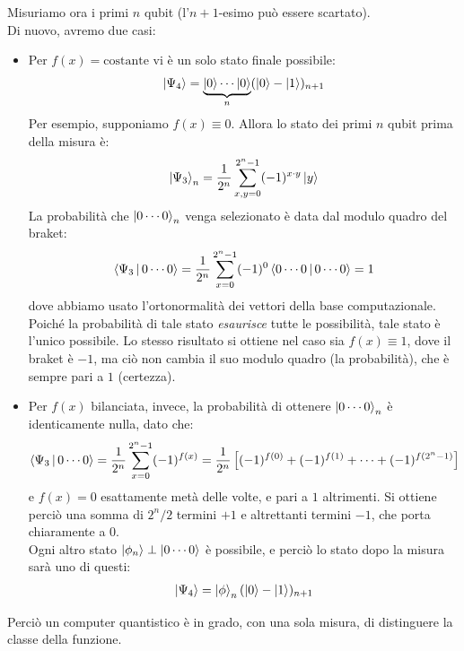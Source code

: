 \documentclass[../../InformazioneQuantistica.tex]{subfiles}
\begin{document}
Misuriamo ora i primi $n$ qubit (l'$n+1$-esimo può essere scartato).\\
Di nuovo, avremo due casi:
\begin{itemize}
\item Per $f(x)=\text{costante}$ vi è un solo stato finale possibile:
\begin{align*}
\Ket{\Psi_4} = \underbrace{\Ket{0}\cdots \Ket{0}}_{n} (\Ket{0}-\Ket{1})_{n+1}
\end{align*}
Per esempio, supponiamo $f(x) \equiv 0$. Allora lo stato dei primi $n$ qubit prima della misura è:
\begin{align*}
    \Ket{\Psi_3}_n = \frac{1}{2^n} \sum_{x,y=0}^{2^n-1} (-1)^{x\cdot y} \Ket{y} 
\end{align*}
La probabilità che $\Ket{0\cdots 0}_n$ venga selezionato è data dal modulo quadro del braket:
\begin{align*}
\Braket{\Psi_3|0\cdots 0} = \frac{1}{2^n} \sum_{x=0}^{2^n-1}(-1)^0 \Braket{0\cdots 0|0\cdots 0} = 1
\end{align*}
dove abbiamo usato l'ortonormalità dei vettori della base computazionale. Poiché la probabilità di tale stato \textit{esaurisce} tutte le possibilità, tale stato è l'unico possibile. Lo stesso risultato si ottiene nel caso sia $f(x) \equiv 1$, dove il braket è $-1$, ma ciò non cambia il suo modulo quadro (la probabilità), che è sempre pari a $1$ (certezza).

\item Per $f(x)$ bilanciata, invece, la probabilità di ottenere $\Ket{0\cdots 0}_n$ è identicamente nulla, dato che:
\begin{align*}
    \Braket{\Psi_3|0\cdots 0} = \frac{1}{2^n} \sum_{x=0}^{2^n-1} (-1)^{f(x)} = \frac{1}{2^n} \left[ (-1)^{f(0)} + (-1)^{f(1)} + \dots + (-1)^{f(2^n-1)} \right ]
\end{align*}
e $f(x) = 0$ esattamente metà delle volte, e pari a $1$ altrimenti. Si ottiene perciò una somma di $2^n/2$ termini $+1$ e altrettanti termini $-1$, che porta chiaramente a $0$.\\
Ogni altro stato $\Ket{\phi_n} \perp \Ket{0\cdots 0}$ è possibile, e perciò lo stato dopo la misura sarà uno di questi:
\begin{align*}
\Ket{\Psi_4} = \Ket{\phi}_n (\Ket{0}-\Ket{1})_{n+1}
\end{align*}
\end{itemize}
Perciò un computer quantistico è in grado, con una sola misura, di distinguere la classe della funzione.\\
\end{document}
